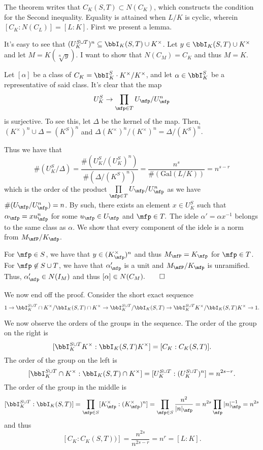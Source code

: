 \documentclass[a4paper, 12pt,oneside,openany]{book}
\begin{document}

The theorem writes that $C_K(S, T) \subset N(C_K)$, which constructs the condition for the Second inequality. Equality is attained when $L/K$ is cyclic, wherein $[C_K: N(C_L)] = [L:K]$. First we present a lemma.


 It's easy to see that $(U_K^{S \cup T})^n \subseteq \bbI_K(S, T) \cup K^\times$. Let $y \in \bbI_K(S, T) \cup K^\times$ and let $M = K(\sqrt[n]{y})$. I want to show that $N(C_M)=C_K$ and thus $M=K$.

Let $[\alpha]$ be a class of $C_K = \bbI_K^S \cdot K^\times / K^\times$, and let $\alpha \in \bbI_K^S$ be a representative of said class. It's clear that the map $$U_K^S \to \prod\limits_{\mfp \in T} U_\mfp / U_\mfp^n$$ is surjective. To see this, let $\Delta$ be the kernel of the map. Then, $(K^\times)^n \cup \Delta = (K^S)^n$ and $\Delta (K^\times)^n / (K^\times)^n = \Delta / (K^S)^n.$

Thus we have that $$\#(U_K^S/ \Delta) = \frac{\# (U_K^S / (U_K^S)^n)}{\# (\Delta / (K^S)^n) } = \frac{n^s}{\#(\text{Gal}(L/K))}=n^{s-r}$$ which is the order of the product $\prod\limits_{\mfp \in T} U_\mfp / U_\mfp^n$ as we have $\#(U_\mfp / U_\mfp^n) = n$. By such, there exists an element $x \in U_K^S$ such that $\alpha_\mfp =xu_\mfp^n$ for some $u_\mfp \in U_\mfp$ and $\mfp\in T.$ The idele $\alpha'=\alpha x^{-1}$ belongs to the same class as $\alpha$. We show that every component of the idele is a norm from $M_\mfP/K_\mfp$. 

For $\mfp \in S$, we have that $y \in (K_\mfp^\times)^n$ and thus $M_\mfP = K_\mfp$ for $\mfp \in T$. For $\mfp \not\in S \cup T$, we have that $\alpha_\mfp'$ is a unit and $M_\mfP/K_\mfp$ is unramified. Thus, $\alpha'_\mfp \in N(I_M)$ and thus $[\alpha] \in N(C_M). \qed$

We now end off the proof. Consider the short exact sequence $$1 \to \bbI_K^{S \cup T} \cap K^\times / \bbI_K(S, T) \cap K^\times \to \bbI_K^{S \cup T} / \bbI_K(S, T) \to \bbI_K^{S \cup T}  K^\times / \bbI_K(S, T) K^\times \to 1.$$

We now observe the orders of the groups in the sequence. The order of the group on the right is $$[\bbI_K^{S \cup T}  K^\times : \bbI_K(S, T) K^\times] = [C_K: C_K(S, T)].$$ The order of the group on the left is $$[\bbI_K^{S \cup T} \cap K^\times : \bbI_K(S, T) \cap K^\times] = [U_K^{S \cup T} :(U_K^{S \cup T})^n] = n^{2s-r}.$$ The order of the group in the middle is $$[\bbI_K^{S \cup T} : \bbI_K(S, T)] = \prod\limits_{\mfp \in S} [K_\mfp^\times:(K_\mfp^\times)^n] = \prod\limits_{\mfp \in S} \frac{n^2}{|n|_\mfp} = n^{2s} \prod\limits_{\mfp} |n|_\mfp^{-1} = n^{2s}$$ and thus $$[C_K:C_K(S, T))] = \frac{n^{2s}}{n^{2s-r}}=n^r = [L:K].$$
\end{document}
